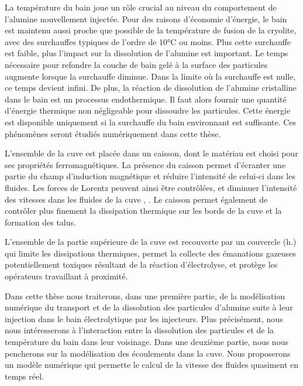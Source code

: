 La température du bain joue un rôle crucial au niveau du comportement
de l'alumine nouvellement injectée. Pour des raisons d'économie
d'énergie, le bain est maintenu aussi proche que possible de la
température de fusion de la cryolite, avec des surchauffes typiques de
l'ordre de \num{10}\si{\celsius} ou moins. Plus cette surchauffe est
faible, plus l'impact sur la dissolution de l'alumine est
important. Le temps nécessaire pour refondre la couche de bain gelé à
la surface des particules augmente lorsque la surchauffe diminue. Dans
la limite où la surchauffe est nulle, ce temps devient infini. De
plus, la réaction de dissolution de l'alumine cristalline dans le bain
est un processus endothermique. Il faut alors fournir une quantité
d'énergie thermique non négligeable pour dissoudre les
particules. Cette énergie est disponible uniquement si la surchauffe
du bain environnant est suffisante. Ces phénomènes seront
étudiés numériquement dans cette thèse.

L'ensemble de la cuve est placée dans un caisson, dont le matériau est
choisi pour ses propriétés ferromagnétiques. La présence du caisson
permet d'écranter une partie du champ d'induction magnétique et
réduire l'intensité de celui-ci dans les fluides. Les forces de
Lorentz peuvent ainsi être contrôlées, et diminuer l'intensité des
vitesses dans les fluides de la cuve \cite{Descloux1998},
\cite{Descloux1991}.  Le caisson permet également de contrôler plus
finement la dissipation thermique sur les bords de la cuve et la
formation des talus.

L'ensemble de la partie supérieure de la cuve est recouverte par un
couvercle (h.) qui limite les dissipations thermiques, permet la collecte
des émanations gazeuses potentiellement toxiques résultant de la
réaction d'électrolyse, et protège les opérateurs travaillant à
proximité.

Dans cette thèse nous traiterons, dans une première partie, de la
modélisation numérique du transport et de la dissolution des
particules d'alumine suite à leur injection dans le bain
électrolytique par les injecteurs. Plus précisément, nous nous
intéresserons à l'interaction entre la dissolution des particules et
de la température du bain dans leur voisinage. Dans une deuxième
partie, nous nous pencherons sur la modélisation des écoulements dans
la cuve. Nous proposerons un modèle numérique qui permette le calcul
de la vitesse des fluides quasiment en temps réel.
